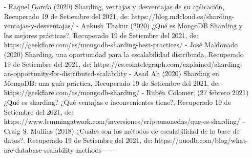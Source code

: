 \documentclass[twoside,twocolumn]{article}
\begin{document}
\begin{thebibliography}{XXX0000}
	\bibitem - Raquel García (2020) Sharding, ventajas y desventajas de su aplicación, Recuperado 19 de Setiembre del 2021, de: https://blog.mdcloud.es/sharding-ventajas-y-desventajas/ 
	\bibitem - Ankush Thakur (2020) ¿Qué es MongoDB Sharding y las mejores prácticas?, Recuperado 19 de Setiembre del 2021, de: https://geekflare.com/es/mongodb-sharding-best-practices/
	\bibitem - José Maldonado (2020) Sharding, una oportunidad para la escalabilidad distribuida, Recuperado 19 de Setiembre del 2021, de: https://es.cointelegraph.com/explained/sharding-an-opportunity-for-distributed-scalability 
	\bibitem - Asad Ali (2020) Sharding en MongoDB: una guía práctica, Recuperado 19 de Setiembre del 2021, de: https://geekflare.com/es/mongodb-sharding/
	\bibitem - Rubén Colomer, (27 febrero 2021) ¿Qué es sharding? ¿Qué ventajas e inconvenientes tiene?, Recuperado 19 de Setiembre del 2021, de: https://www.lemmingatwork.com/inversiones/criptomonedas/que-es-sharding/  
	\bibitem - Craig S. Mullins (2018) ¿Cuáles son los métodos de escalabilidad de la base de datos?, Recuperado 19 de Setiembre del 2021, de: https://nuodb.com/blog/what-are-database-scalability-methods 
	\bibitem - 
	\bibitem - 
	\bibitem - 
	\end{thebibliography}

\end{document}

